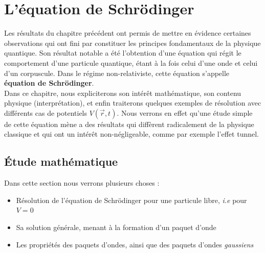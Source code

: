 
\chapter{L'équation de Schrödinger}
Les résultats du chapitre précédent ont permis de mettre en évidence certaines observations qui ont fini par constituer les principes fondamentaux de la physique quantique. Son résultat notable a été l'obtention d'une équation qui régit le comportement d'une particule quantique, étant à la fois celui d'une onde et celui d'un corpuscule. Dans le régime non-relativiste, cette équation s'appelle \textbf{équation de Schrödinger}. \\
Dans ce chapitre, nous expliciterons son intérêt mathématique, son contenu physique (interprétation), et enfin traiterons quelques exemples de résolution avec différents cas de potentiels $V(\vec{r},t)$. Nous verrons en effet qu'une étude simple de cette équation mène a des résultats qui diffèrent radicalement de la physique classique et qui ont un intérêt non-négligeable, comme par exemple l'effet tunnel. 


\section{Étude mathématique}
Dans cette section nous verrons plusieurs choses :
\begin{itemize}[label= \textbullet]
  \item Résolution de l'équation de Schrödinger pour une particule libre, \textit{i.e} pour $V = 0$
  \item Sa solution générale, menant à la formation d'un paquet d'onde
  \item Les propriétés des paquets d'ondes, ainsi que des paquets d'ondes \textit{gaussiens}
\end{itemize}
